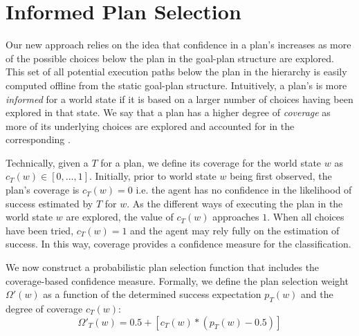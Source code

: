 \section{Informed Plan Selection}\label{sec:coverage}

Our new approach relies on the idea that confidence in a plan's
\dt increases as more of the possible choices below the plan
in the goal-plan structure are explored.
This set of all potential execution paths
below the plan in the hierarchy is easily computed offline from the static goal-plan structure.
Intuitively, a plan's \dt is more \textit{informed} for a world
state if it is based on a larger number of choices having been
explored in that state.
We say that a plan has a higher degree of \emph{coverage} as more of its
underlying choices are explored and accounted for in the
corresponding \dt.

Technically, given a \dt $T$ for a plan, we define its coverage for the world state $w$ as 
$c_T(w) \in [0,\ldots,1]$.
Initially, prior to world state $w$ being first observed, the plan's coverage is 
$c_T(w)=0$ i.e. the agent has no confidence in the likelihood of success estimated by $T$ for $w$. As the
different ways of executing the plan in the world state $w$ are explored, the value of
$c_T(w)$ approaches $1$. When all choices have been tried, $c_T(w)=1$ and the
agent may rely fully on the \dt estimation of success.
In this way, coverage provides a confidence measure for the \dt classification.

We now construct a probabilistic plan selection function that includes the coverage-based confidence measure.
Formally, we define the plan selection weight $\Omega'(w)$ as a function of the \dt determined success expectation $p_T(w)$ and the degree of coverage $c_T(w)$:
%
\begin{equation*}\label{eqn:coverage}   
\Omega'_T(w) = 0.5 + \left[  c_T(w) *  \left( p_T(w) - 0.5 \right)  \right]
\end{equation*}
	

